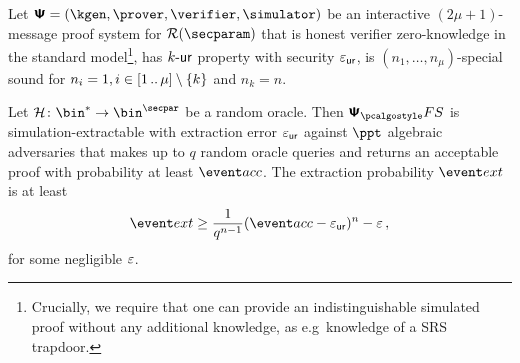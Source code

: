 \documentclass[runningheads,11pt]{llncs}
\theoremstyle{definition} \newtheorem{definition}[theorem]{Definition}
\begin{document}
\begin{theorem}
\label{thm:se}
Let $\ps = (\kgen, \prover, \verifier, \simulator)$ be an interactive
$(2 \mu + 1)$-message proof system for $\RELGEN(\secparam)$ that is honest
verifier zero-knowledge in the standard model\footnote{Crucially, we require
  that one can provide an indistinguishable simulated proof without any
  additional knowledge, as e.g~knowledge of a SRS trapdoor.}, has ${k\text{-}\mathsf{ur}}$
property with security $\varepsilon_{\mathsf{ur}}$, is $(n_1, \ldots, n_\mu)$-special
sound for $n_i = 1, i \in [1 \, .. \, \mu] \setminus \{k\}$ and $n_k = n$.

Let $\ro\colon \bin^{*} \to \bin^{\secpar}$ be a random oracle. 
Then $\psfs$ is simulation-extractable with extraction error $\varepsilon_{\mathsf{ur}}$
against $\ppt$ algebraic adversaries that makes up to $q$ random oracle queries and
returns an acceptable proof with probability at least $\accProb$. 
The extraction probability $\extProb$ is at least
\[
	\extProb \geq \frac{1}{q^{n - 1}} (\accProb - \epsur)^{n} -\eps\,,
\]
for some negligible $\varepsilon$.	
\end{theorem}
\end{document}
